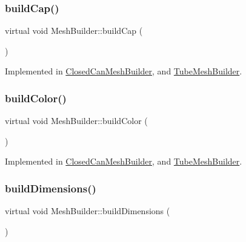 \subsubsection{\texorpdfstring{buildCap()}{buildCap()}}
{\footnotesize\ttfamily virtual void Mesh\+Builder\+::build\+Cap (\begin{DoxyParamCaption}{ }\end{DoxyParamCaption})\hspace{0.3cm}{\ttfamily [pure virtual]}}



Implemented in \mbox{\hyperlink{class_closed_can_mesh_builder_a6fd7852b01e6afc04346f80a5f2f4459}{Closed\+Can\+Mesh\+Builder}}, and \mbox{\hyperlink{class_tube_mesh_builder_a7763461e42bd9db6b7d69eb5c7ad4e05}{Tube\+Mesh\+Builder}}.

\mbox{\label{class_mesh_builder_a205a6daf8b50d88eebe1df434b7bf0c4}} 
\subsubsection{\texorpdfstring{buildColor()}{buildColor()}}
{\footnotesize\ttfamily virtual void Mesh\+Builder\+::build\+Color (\begin{DoxyParamCaption}{ }\end{DoxyParamCaption})\hspace{0.3cm}{\ttfamily [pure virtual]}}



Implemented in \mbox{\hyperlink{class_closed_can_mesh_builder_ae99058cb912a5d9e1f34e49241f4c8c7}{Closed\+Can\+Mesh\+Builder}}, and \mbox{\hyperlink{class_tube_mesh_builder_afcdbd454d1ba0c3eed4efb5120783e08}{Tube\+Mesh\+Builder}}.

\mbox{\label{class_mesh_builder_af715a8510c99c7925bd8e6f0b6b182d7}} 
\subsubsection{\texorpdfstring{buildDimensions()}{buildDimensions()}}
{\footnotesize\ttfamily virtual void Mesh\+Builder\+::build\+Dimensions (\begin{DoxyParamCaption}{ }\end{DoxyParamCaption})\hspace{0.3cm}{\ttfamily [pure virtual]}}




